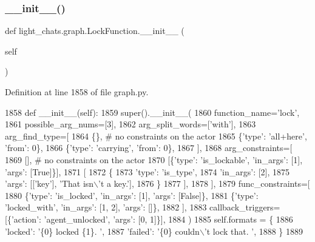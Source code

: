 \subsubsection{\texorpdfstring{\+\_\+\+\_\+init\+\_\+\+\_\+()}{\_\_init\_\_()}}
{\footnotesize\ttfamily def light\+\_\+chats.\+graph.\+Lock\+Function.\+\_\+\+\_\+init\+\_\+\+\_\+ (\begin{DoxyParamCaption}\item[{}]{self }\end{DoxyParamCaption})}



Definition at line 1858 of file graph.\+py.


\begin{DoxyCode}
1858     \textcolor{keyword}{def }\_\_init\_\_(self):
1859         super().\_\_init\_\_(
1860             function\_name=\textcolor{stringliteral}{'lock'},
1861             possible\_arg\_nums=[3],
1862             arg\_split\_words=[\textcolor{stringliteral}{'with'}],
1863             arg\_find\_type=[
1864                 \{\},  \textcolor{comment}{# no constraints on the actor}
1865                 \{\textcolor{stringliteral}{'type'}: \textcolor{stringliteral}{'all+here'}, \textcolor{stringliteral}{'from'}: 0\},
1866                 \{\textcolor{stringliteral}{'type'}: \textcolor{stringliteral}{'carrying'}, \textcolor{stringliteral}{'from'}: 0\},
1867             ],
1868             arg\_constraints=[
1869                 [],  \textcolor{comment}{# no constraints on the actor}
1870                 [\{\textcolor{stringliteral}{'type'}: \textcolor{stringliteral}{'is\_lockable'}, \textcolor{stringliteral}{'in\_args'}: [1], \textcolor{stringliteral}{'args'}: [\textcolor{keyword}{True}]\}],
1871                 [
1872                     \{
1873                         \textcolor{stringliteral}{'type'}: \textcolor{stringliteral}{'is\_type'},
1874                         \textcolor{stringliteral}{'in\_args'}: [2],
1875                         \textcolor{stringliteral}{'args'}: [[\textcolor{stringliteral}{'key'}], \textcolor{stringliteral}{'That isn\(\backslash\)'t a key.'}],
1876                     \}
1877                 ],
1878             ],
1879             func\_constraints=[
1880                 \{\textcolor{stringliteral}{'type'}: \textcolor{stringliteral}{'is\_locked'}, \textcolor{stringliteral}{'in\_args'}: [1], \textcolor{stringliteral}{'args'}: [\textcolor{keyword}{False}]\},
1881                 \{\textcolor{stringliteral}{'type'}: \textcolor{stringliteral}{'locked\_with'}, \textcolor{stringliteral}{'in\_args'}: [1, 2], \textcolor{stringliteral}{'args'}: []\},
1882             ],
1883             callback\_triggers=[\{\textcolor{stringliteral}{'action'}: \textcolor{stringliteral}{'agent\_unlocked'}, \textcolor{stringliteral}{'args'}: [0, 1]\}],
1884         )
1885         self.formats = \{
1886             \textcolor{stringliteral}{'locked'}: \textcolor{stringliteral}{'\{0\} locked \{1\}. '},
1887             \textcolor{stringliteral}{'failed'}: \textcolor{stringliteral}{'\{0\} couldn\(\backslash\)'t lock that. '},
1888         \}
1889 
\end{DoxyCode}


